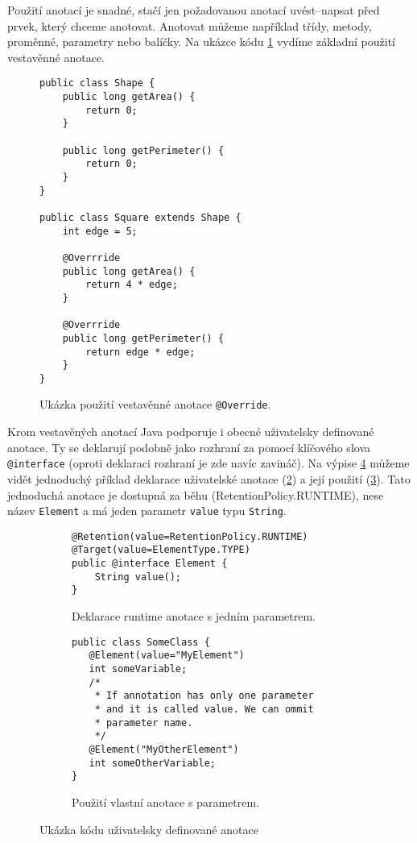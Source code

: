 Použití anotací je snadné, stačí jen požadovanou anotací uvést--napsat před prvek, který chceme anotovat. Anotovat můžeme například třídy, metody, proměnné, parametry nebo balíčky.
Na ukázce kódu \ref{code:ann:bultin} vydíme základní použití vestavěnné anotace.
\begin{figure}[!h]
\begin{lstlisting}
public class Shape {
    public long getArea() {
        return 0;
    }
    
    public long getPerimeter() {
        return 0;
    } 
}

public class Square extends Shape {
    int edge = 5;
    
    @Overrride
    public long getArea() {
        return 4 * edge;
    }
    
    @Overrride
    public long getPerimeter() {
        return edge * edge;
    }
}
\end{lstlisting}
\caption{Ukázka použití vestavěnné anotace \texttt{@Override}.}
\label{code:ann:bultin}
\end{figure}

Krom vestavěných anotací Java podporuje i obecné uživatelsky definované anotace. Ty se deklarují podobně jako rozhraní za pomocí klíčového slova \texttt{@interface} (oproti deklaraci rozhraní je zde navíc zavináč). Na výpise \ref{code:ann:ud} můžeme vidět jednoduchý příklad deklarace uživatelské anotace (\ref{code:ann:ud:run:dec}) a její použití (\ref{code:ann:ud:run:use}). Tato jednoduchá anotace je dostupná za běhu (RetentionPolicy.RUNTIME), nese název \texttt{Element} a má jeden parametr \texttt{value} typu \texttt{String}. 
\begin{figure}
\begin{subfigure}[b]{1\textwidth}
\caption{Deklarace runtime anotace s jedním parametrem.}
\label{code:ann:ud:run:dec}
\begin{lstlisting}
@Retention(value=RetentionPolicy.RUNTIME)
@Target(value=ElementType.TYPE)
public @interface Element {
    String value(); 
}
\end{lstlisting}
\end{subfigure}
\begin{subfigure}[b]{1\textwidth}
\caption{Použití vlastní anotace s parametrem.}
\label{code:ann:ud:run:use}
\begin{lstlisting}
public class SomeClass {
   @Element(value="MyElement")
   int someVariable;
   /* 
    * If annotation has only one parameter
    * and it is called value. We can ommit
    * parameter name.
    */
   @Element("MyOtherElement")
   int someOtherVariable;
}
\end{lstlisting}
\end{subfigure}
\caption{Ukázka kódu uživatelsky definované anotace}\label{code:ann:ud}
\end{figure}
